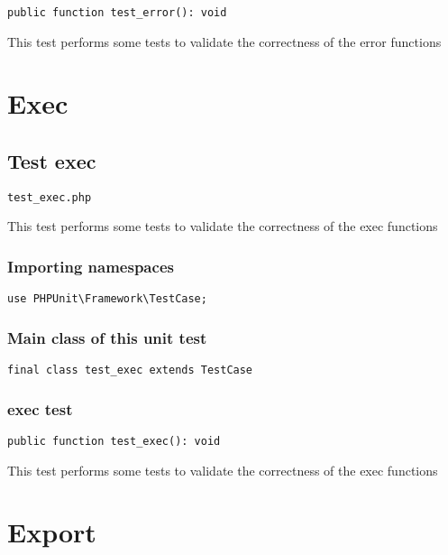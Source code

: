 \documentclass[a4paper]{article}
\begin{document}
\begin{lstlisting}
public function test_error(): void
\end{lstlisting}

This test performs some tests to validate the correctness
of the error functions


\hypertarget{toc164}{}
\section{Exec}

\hypertarget{toc165}{}
\subsection{Test exec}

\begin{lstlisting}
test_exec.php
\end{lstlisting}

This test performs some tests to validate the correctness
of the exec functions

\hypertarget{toc166}{}
\subsubsection{Importing namespaces}

\begin{lstlisting}
use PHPUnit\Framework\TestCase;
\end{lstlisting}

\hypertarget{toc167}{}
\subsubsection{Main class of this unit test}

\begin{lstlisting}
final class test_exec extends TestCase
\end{lstlisting}

\hypertarget{toc168}{}
\subsubsection{exec test}

\begin{lstlisting}
public function test_exec(): void
\end{lstlisting}

This test performs some tests to validate the correctness
of the exec functions


\hypertarget{toc169}{}
\section{Export}
\end{document}
